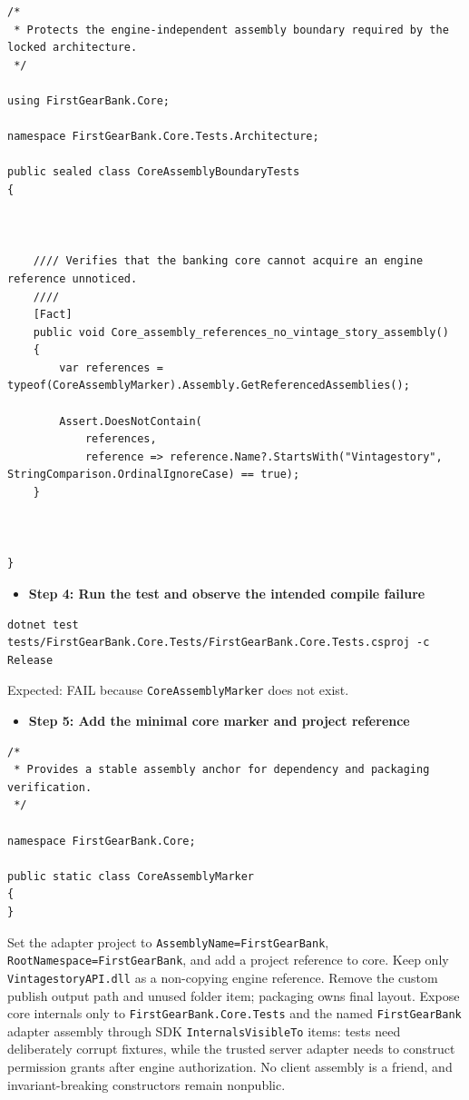 \documentclass[
  10pt,
  letterpaper,
]{article}
\newcommand{\passthrough}[1]{#1}
\providecommand{\tightlist}{%
  \setlength{\itemsep}{0pt}\setlength{\parskip}{0pt}}
\begin{document}
\begin{lstlisting}
/*
 * Protects the engine-independent assembly boundary required by the locked architecture.
 */

using FirstGearBank.Core;

namespace FirstGearBank.Core.Tests.Architecture;

public sealed class CoreAssemblyBoundaryTests
{



    //// Verifies that the banking core cannot acquire an engine reference unnoticed.
    ////
    [Fact]
    public void Core_assembly_references_no_vintage_story_assembly()
    {
        var references = typeof(CoreAssemblyMarker).Assembly.GetReferencedAssemblies();

        Assert.DoesNotContain(
            references,
            reference => reference.Name?.StartsWith("Vintagestory", StringComparison.OrdinalIgnoreCase) == true);
    }



}
\end{lstlisting}

\begin{itemize}
\tightlist
\item[$\square$]
  \textbf{Step 4: Run the test and observe the intended compile failure}
\end{itemize}

\begin{lstlisting}
dotnet test tests/FirstGearBank.Core.Tests/FirstGearBank.Core.Tests.csproj -c Release
\end{lstlisting}

Expected: FAIL because \passthrough{\lstinline!CoreAssemblyMarker!} does
not exist.

\begin{itemize}
\tightlist
\item[$\square$]
  \textbf{Step 5: Add the minimal core marker and project reference}
\end{itemize}

\begin{lstlisting}
/*
 * Provides a stable assembly anchor for dependency and packaging verification.
 */

namespace FirstGearBank.Core;

public static class CoreAssemblyMarker
{
}
\end{lstlisting}

Set the adapter project to
\texttt{AssemblyName=}\allowbreak{}\texttt{FirstGearBank},
\texttt{RootNamespace=}\allowbreak{}\texttt{FirstGearBank}, and add a
project reference to core. Keep only
\passthrough{\lstinline!VintagestoryAPI.dll!} as a non-copying engine
reference. Remove the custom publish output path and unused folder item;
packaging owns final layout. Expose core internals only to
\texttt{FirstGearBank.}\allowbreak{}\texttt{Core.}\allowbreak{}\texttt{Tests}
and the named \passthrough{\lstinline!FirstGearBank!} adapter assembly
through SDK \passthrough{\lstinline!InternalsVisibleTo!} items: tests
need deliberately corrupt fixtures, while the trusted server adapter
needs to construct permission grants after engine authorization. No
client assembly is a friend, and invariant-breaking constructors remain
nonpublic.
\end{document}
